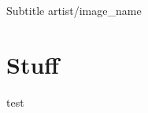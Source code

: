 \documentclass[a4paper,openany]{book}
\begin{document}

%
	{Subtitle}%
	{artist/image_name}

\frontmatter

\tableofcontents

\mainmatter

\chapter{Stuff}

test
\end{document}
